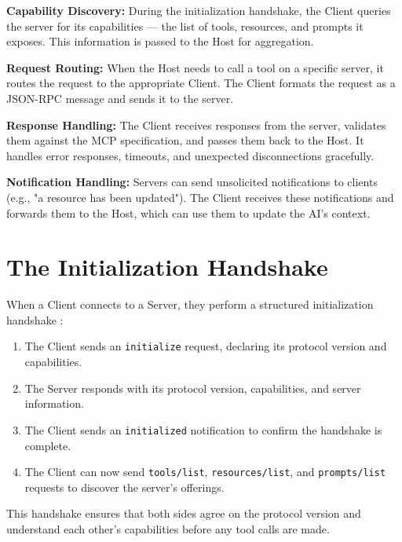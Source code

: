\textbf{Capability Discovery:} During the initialization handshake, the Client queries the server for its capabilities — the list of tools, resources, and prompts it exposes. This information is passed to the Host for aggregation.

\textbf{Request Routing:} When the Host needs to call a tool on a specific server, it routes the request to the appropriate Client. The Client formats the request as a JSON-RPC message and sends it to the server.

\textbf{Response Handling:} The Client receives responses from the server, validates them against the MCP specification, and passes them back to the Host. It handles error responses, timeouts, and unexpected disconnections gracefully.

\textbf{Notification Handling:} Servers can send unsolicited notifications to clients (e.g., "a resource has been updated"). The Client receives these notifications and forwards them to the Host, which can use them to update the AI's context.

\section{The Initialization Handshake}
When a Client connects to a Server, they perform a structured initialization handshake \cite{anthropic2024mcp}:

\begin{enumerate}
    \item The Client sends an \texttt{initialize} request, declaring its protocol version and capabilities.
    \item The Server responds with its protocol version, capabilities, and server information.
    \item The Client sends an \texttt{initialized} notification to confirm the handshake is complete.
    \item The Client can now send \texttt{tools/list}, \texttt{resources/list}, and \texttt{prompts/list} requests to discover the server's offerings.
\end{enumerate}

This handshake ensures that both sides agree on the protocol version and understand each other's capabilities before any tool calls are made.

